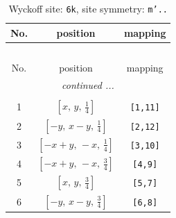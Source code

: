 \documentclass[fleqn,8pt]{jsarticle}
\begin{document}
\renewcommand{\arraystretch}{1.2}
\begin{longtable}{ccc}
\caption{Wyckoff site: {\tt 6k}, site symmetry: {\tt m'..}}
 \\
 \hline \hline
No. & position & mapping \\ \hline \endfirsthead

\multicolumn{2}{l}{\tablename\ \thetable{}} \\
 \hline \hline
No. & position & mapping \\ \hline \endhead

 \hline \hline
\multicolumn{2}{r}{\footnotesize\it continued ...} \\ \endfoot

 \hline \hline
\multicolumn{2}{r}{} \\ \endlastfoot

1 & $\left[ x,\, y,\, \frac{1}{4} \right]$ & {\tt [1,11]} \\ \hline
2 & $\left[ - y,\, x - y,\, \frac{1}{4} \right]$ & {\tt [2,12]} \\ \hline
3 & $\left[ - x + y,\, - x,\, \frac{1}{4} \right]$ & {\tt [3,10]} \\ \hline
4 & $\left[ - x + y,\, - x,\, \frac{3}{4} \right]$ & {\tt [4,9]} \\ \hline
5 & $\left[ x,\, y,\, \frac{3}{4} \right]$ & {\tt [5,7]} \\ \hline
6 & $\left[ - y,\, x - y,\, \frac{3}{4} \right]$ & {\tt [6,8]} \\
\end{longtable}
\renewcommand{\arraystretch}{1.2}
\end{document}
